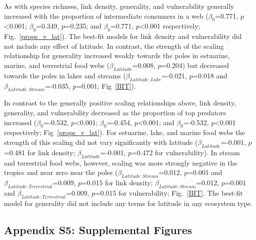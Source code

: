 \documentclass[12pt]{article}
\begin{document}
    As with species richness, link density, generality, and vulnerability
    generally increased with the proportion of intermediate consumers in a web
    ($\beta_0$=0.771, $p$\textless0.001; $\beta_0$=0.349, $p$=0.235; and
    $\beta_0$=0.771, $p$\textless0.001 respectively; Fig.~\ref{props_v_lat}). 
    The best-fit models for link density and vulnerability did not include
    any effect of latitude. In contrast, the strength of the scaling relationship
    for generality increased weakly towards the poles in estuarine, marine, and
    terrestrial food webs ($\beta_{Latitude}$=0.008, $p$=0.204) but decreased 
    towards the poles in lakes and streams ($\beta_{Latitude:Lake}$=-0.021, $p$=0.018
    and $\beta_{Latitude:Stream}$=-0.035, $p$=0.001; Fig~\ref{BIT}).


    In contrast to the generally positive scaling relationships above, link
    density, generality, and vulnerability decreased as the proportion of top
    predators increased ($\beta_0$=-0.532, $p$\textless0.001; $\beta_0$=-0.454,
    $p$\textless0.001; and $\beta_0$=-0.532, $p$\textless0.001 respectively;
    Fig~\ref{props_v_lat}). For estuarine, lake, and marine food webs the
    strength of this scaling did not vary significantly with latitude
    ($\beta_{Latitude}$=-0.001, $p$=0.481 for link density;
    $\beta_{Latitude}$=-0.001, $p$=0.472 for vulnerability).
    In stream and terrestrial food webs, however, scaling was more strongly negative in the 
    tropics and near zero near the poles ($\beta_{Latitude:Stream}$=0.012, $p$=0.001 
    and $\beta_{Latitude:Terrestrial}$=0.009, $p$=0.015 for link density;
    $\beta_{Latitude:Stream}$=0.012, $p$=0.001 and $\beta_{Latitude:Terrestrial}$=0.009, $p$=0.015
    for vulnerability; Fig.~\ref{BIT}. The best-fit model for generality did not include any terms
    for latitude in any ecosystem type.




\newpage

\subsection*{Appendix S5: Supplemental Figures}
\end{document}
